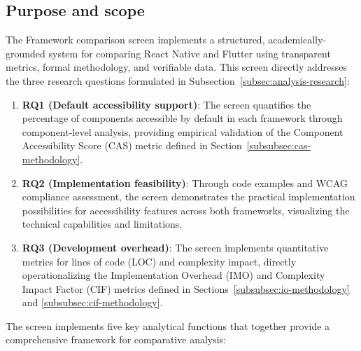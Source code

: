 \FloatBarrier

\subsection{Purpose and scope}
\label{subsec:framework-comparison-purpose}

The Framework comparison screen implements a structured, academically-grounded system for comparing React Native and Flutter using transparent metrics, formal methodology, and verifiable data. This screen directly addresses the three research questions formulated in Subsection~\ref{subsec:analysis-research}:

\begin{enumerate}
    \item \textbf{RQ1 (Default accessibility support)}: The screen quantifies the percentage of components accessible by default in each framework through component-level analysis, providing empirical validation of the Component Accessibility Score (CAS) metric defined in Section~\ref{subsubsec:cas-methodology}.
    
    \item \textbf{RQ2 (Implementation feasibility)}: Through code examples and WCAG compliance assessment, the screen demonstrates the practical implementation possibilities for accessibility features across both frameworks, visualizing the technical capabilities and limitations.
    
    \item \textbf{RQ3 (Development overhead)}: The screen implements quantitative metrics for lines of code (LOC) and complexity impact, directly operationalizing the Implementation Overhead (IMO) and Complexity Impact Factor (CIF) metrics defined in Sections~\ref{subsubsec:io-methodology} and \ref{subsubsec:cif-methodology}.
\end{enumerate}

The screen implements five key analytical functions that together provide a comprehensive framework for comparative analysis:

